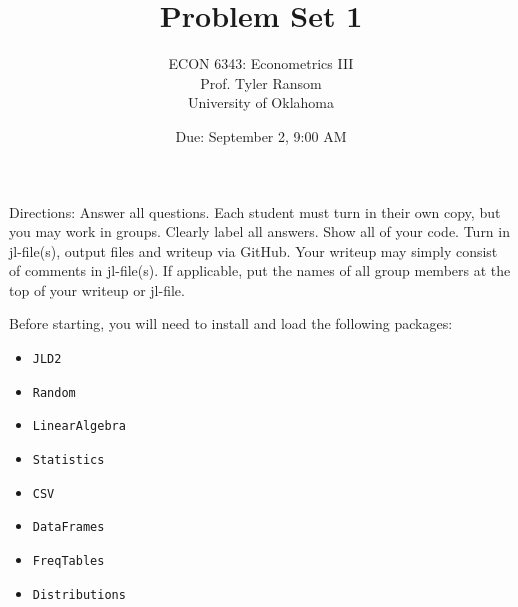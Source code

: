 \documentclass[12pt,english]{article}
\begin{document}
\title{Problem Set 1}
\author{ECON 6343: Econometrics III\\
Prof. Tyler Ransom\\
University of Oklahoma}
\date{Due: September 2, 9:00 AM}

\maketitle
Directions: Answer all questions. Each student must turn in their own copy, but you may work in groups. Clearly label all answers. Show all of your code. Turn in jl-file(s), output files and writeup via GitHub. Your writeup may simply consist of comments in jl-file(s). If applicable, put the names of all group members at the top of your writeup or jl-file.


Before starting, you will need to install and load the following packages:
\begin{itemize}
    \item[~] \texttt{JLD2}
    \item[~] \texttt{Random}
    \item[~] \texttt{LinearAlgebra}
    \item[~] \texttt{Statistics}
    \item[~] \texttt{CSV} 
    \item[~] \texttt{DataFrames} 
    \item[~] \texttt{FreqTables} 
    \item[~] \texttt{Distributions} 
\end{itemize}
\end{document}
